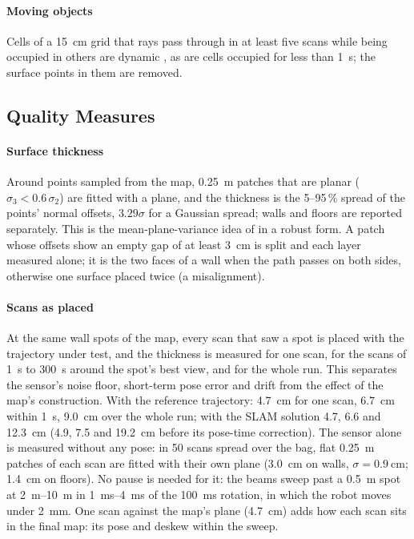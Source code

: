 \paragraph{Moving objects} Cells of a \SI{15}{\centi\metre} grid that rays
pass through in at least five scans while being occupied in others are
dynamic \cite{dufomap}, as are cells occupied for less than
\SI{1}{\second}; the surface points in them are removed.

\subsection{Quality Measures}
\label{sec:supp_quality}
\paragraph{Surface thickness} Around points sampled from the map,
\SI{0.25}{\metre} patches that are planar ($\sigma_3<0.6\,\sigma_2$) are
fitted with a plane, and the thickness is the 5--95\,\% spread of the
points' normal offsets, $3.29\sigma$ for a Gaussian spread; walls and floors
are reported separately. This is the mean-plane-variance idea of
\cite{razlaw} in a robust form. A patch whose offsets show an empty gap of
at least \SI{3}{\centi\metre} is split and each layer measured alone; it is
the two faces of a wall when the path passes on both sides, otherwise one
surface placed twice (a misalignment).

\paragraph{Scans as placed} At the same wall spots of the map, every scan
that saw a spot is placed with the trajectory under test, and the thickness
is measured for one scan, for the scans of \SI{1}{\second} to
\SI{300}{\second} around the spot's best view, and for the whole run. This
separates the sensor's noise floor, short-term pose error and drift from
the effect of the map's construction. With the reference trajectory:
\SI{4.7}{\centi\metre} for one scan, \SI{6.7}{\centi\metre} within
\SI{1}{\second}, \SI{9.0}{\centi\metre} over the whole run; with the SLAM
solution 4.7, 6.6 and \SI{12.3}{\centi\metre} (4.9, 7.5 and
\SI{19.2}{\centi\metre} before its pose-time correction). The sensor
alone is measured without any pose: in 50 scans spread over the bag, flat
\SI{0.25}{\metre} patches of each scan are fitted with their own plane
(\SI{3.0}{\centi\metre} on walls, $\sigma=\SI{0.9}{\centi\metre}$;
\SI{1.4}{\centi\metre} on floors). No pause is needed for it: the beams
sweep past a \SI{0.5}{\metre} spot at \SIrange{2}{10}{\metre} in
\SIrange{1}{4}{\milli\second} of the \SI{100}{\milli\second} rotation, in
which the robot moves under \SI{2}{\milli\metre}. One scan against the
map's plane (\SI{4.7}{\centi\metre}) adds how each scan sits in the final
map: its pose and deskew within the sweep.

